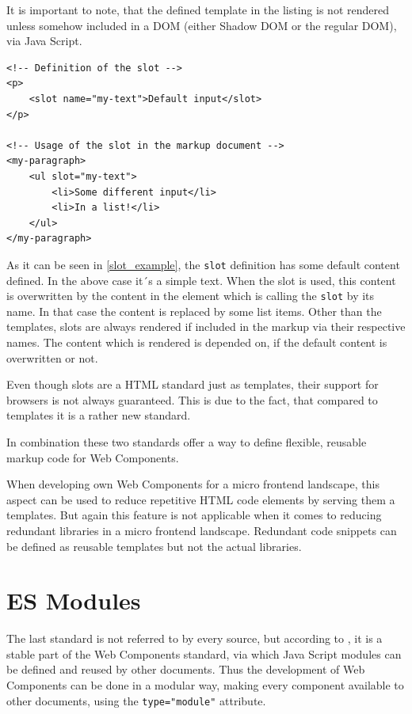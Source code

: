 It is important to note, that the defined template in the listing is not rendered unless somehow included in a DOM (either Shadow DOM or the regular DOM), via Java Script.

\begin{lstlisting}[language=HTML5, caption=Definition and usage of the \texttt{slot} standard \cite{wc_html_template_slots}, label=slot_example]
<!-- Definition of the slot -->
<p>
	<slot name="my-text">Default input</slot>
</p>

<!-- Usage of the slot in the markup document -->
<my-paragraph>
	<ul slot="my-text">
		<li>Some different input</li>
		<li>In a list!</li>
	</ul>
</my-paragraph>
\end{lstlisting}

As it can be seen in \ref{slot_example}, the \texttt{slot} definition has some default content defined. In the above case it´s a simple text. When the slot is used, this content is overwritten by the content in the element which is calling the \texttt{slot} by its name.
In that case the content is replaced by some list items.
Other than the templates, slots are always rendered if included in the markup via their respective names. The content which is rendered is depended on, if the default content is overwritten or not.

Even though slots are a HTML standard just as templates, their support for browsers is not always guaranteed. This is due to the fact, that compared to templates it is a rather new standard.

In combination these two standards offer a way to define flexible, reusable markup code for Web Components.\cite{wc_html_template_slots} 

When developing own Web Components for a micro frontend landscape, this aspect can be used to reduce repetitive HTML code elements by serving them a templates. But again this feature is not applicable when it comes to reducing redundant libraries in a micro frontend landscape. Redundant code snippets can be defined as reusable templates but not the actual libraries.

\section{ES Modules}

The last standard is not referred to by every source, but according to \cite{wc_specifications}, it is a stable part of the Web Components standard, via which Java Script modules can be defined and reused by other documents.
Thus the development of Web Components can be done in a modular way, making every component available to other documents, using the \texttt{type="module"} attribute.

